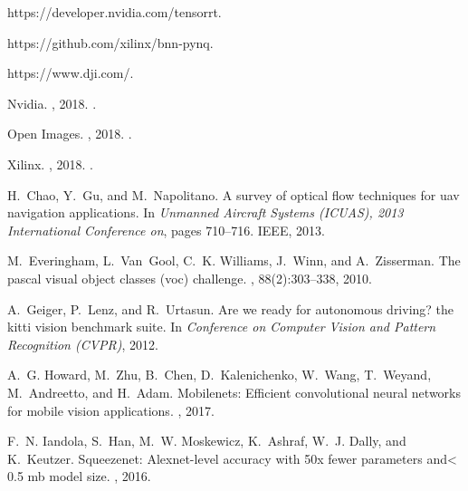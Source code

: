 \documentclass[10pt,journal,compsoc]{IEEEtran}
\begin{document}

%
%

\begin{thebibliography}{10}

https://developer.nvidia.com/tensorrt.

https://github.com/xilinx/bnn-pynq.

https://www.dji.com/.

{Nvidia}.
, 2018.
.

{Open Images}.
, 2018.
.

{Xilinx}.
, 2018.
.

H.~Chao, Y.~Gu, and M.~Napolitano.
\newblock A survey of optical flow techniques for uav navigation applications.
\newblock In {\em Unmanned Aircraft Systems (ICUAS), 2013 International
  Conference on}, pages 710--716. IEEE, 2013.

M.~Everingham, L.~Van~Gool, C.~K. Williams, J.~Winn, and A.~Zisserman.
\newblock The pascal visual object classes (voc) challenge.
, 88(2):303--338, 2010.

A.~Geiger, P.~Lenz, and R.~Urtasun.
\newblock Are we ready for autonomous driving? the kitti vision benchmark
  suite.
\newblock In {\em Conference on Computer Vision and Pattern Recognition
  (CVPR)}, 2012.

A.~G. Howard, M.~Zhu, B.~Chen, D.~Kalenichenko, W.~Wang, T.~Weyand,
  M.~Andreetto, and H.~Adam.
\newblock Mobilenets: Efficient convolutional neural networks for mobile vision
  applications.
, 2017.

F.~N. Iandola, S.~Han, M.~W. Moskewicz, K.~Ashraf, W.~J. Dally, and K.~Keutzer.
\newblock Squeezenet: Alexnet-level accuracy with 50x fewer parameters and< 0.5
  mb model size.
, 2016.


\end{thebibliography}
\end{document}
